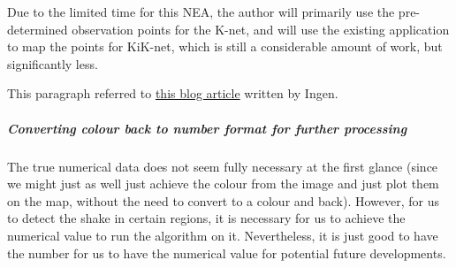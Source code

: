 \documentclass[10pt]{article}
\begin{document}
Due to the limited time for this NEA, the author will primarily use the pre-determined observation points for the K-net, and will use the existing application to map the points for KiK-net, which is still a considerable amount of work, but significantly less.

This paragraph referred to \href{https://qiita.com/ingen084/items/7e91f8da2996972ac586}{this blog article} written by Ingen.


\subparagraph{Converting colour back to number format for further processing}

The true numerical data does not seem fully necessary at the first glance (since we might just as well just achieve the colour from the image and just plot them on the map, without the need to convert to a colour and back). However, for us to detect the shake in certain regions, it is necessary for us to achieve the numerical value to run the algorithm on it. Nevertheless, it is just good to have the number for us to have the numerical value for potential future developments.
\end{document}
